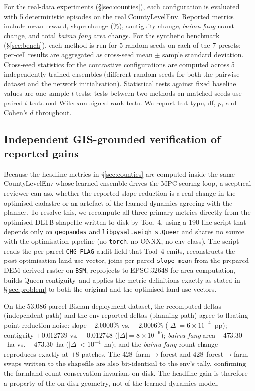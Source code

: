 \documentclass[11pt]{article}
\begin{document}
For the real-data experiments (\S\ref{sec:counties}), each configuration is evaluated with 5 deterministic episodes on the real CountyLevelEnv. Reported metrics include mean reward, slope change ($\%$), contiguity change, \textit{baimu fang} count change, and total \textit{baimu fang} area change. For the synthetic benchmark (\S\ref{sec:bench}), each method is run for 5 random seeds on each of the 7 presets; per-cell results are aggregated as cross-seed mean $\pm$ sample standard deviation. Cross-seed statistics for the contrastive configurations are computed across 5 independently trained ensembles (different random seeds for both the pairwise dataset and the network initialisation). Statistical tests against fixed baseline values are one-sample $t$-tests; tests between two methods on matched seeds use paired $t$-tests and Wilcoxon signed-rank tests. We report test type, df, $p$, and Cohen's $d$ throughout.

\subsection*{Independent GIS-grounded verification of reported gains}\label{sec:methods-validate}

Because the headline metrics in \S\ref{sec:counties} are computed inside the same CountyLevelEnv whose learned ensemble drives the MPC scoring loop, a sceptical reviewer can ask whether the reported slope reduction is a real change in the optimised cadastre or an artefact of the learned dynamics agreeing with the planner. To resolve this, we recompute all three primary metrics directly from the optimised DLTB shapefile written to disk by Tool~4, using a 190-line script that depends only on \texttt{geopandas} and \texttt{libpysal.weights.Queen} and shares no source with the optimisation pipeline (no \texttt{torch}, no ONNX, no env class). The script reads the per-parcel \texttt{CHG\_FLAG} audit field that Tool~4 emits, reconstructs the post-optimisation land-use vector, joins per-parcel \texttt{slope\_mean} from the prepared DEM-derived raster on \texttt{BSM}, reprojects to EPSG:32648 for area computation, builds Queen contiguity, and applies the metric definitions exactly as stated in \S\ref{sec:problem} to both the original and the optimised land-use vectors.

On the 53{,}086-parcel Bishan deployment dataset, the recomputed deltas (independent path) and the env-reported deltas (planning path) agree to floating-point reduction noise: slope $-2.0000\%$ vs.\ $-2.0006\%$ ($|\Delta|{=}6{\times}10^{-4}$~pp); contiguity $+0.012739$ vs.\ $+0.012748$ ($|\Delta|{=}8{\times}10^{-6}$); \textit{baimu fang} area $-473.30$~ha vs.\ $-473.30$~ha ($|\Delta|{<}10^{-4}$~ha); and the \textit{baimu fang} count change reproduces exactly at $+8$ patches. The 428~farm$\rightarrow$forest and 428~forest$\rightarrow$farm swaps written to the shapefile are also bit-identical to the env's tally, confirming the farmland-count conservation invariant on disk. The headline gain is therefore a property of the on-disk geometry, not of the learned dynamics model.
\end{document}
